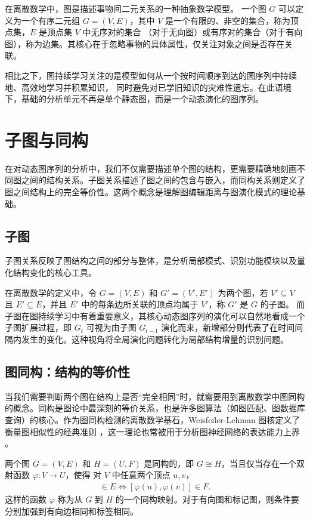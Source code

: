 在离散数学中，图是描述事物间二元关系的一种抽象数学模型。
一个图 $G$ 可以定义为一个有序二元组 $G=(V,E)$，其中 $V$ 是一个有限的、非空的集合，称为顶点集，$E$ 是顶点集 $V$ 中无序对的集合
（对于无向图）或有序对的集合（对于有向图），称为边集。其核心在于忽略事物的具体属性，仅关注对象之间是否存在关联。

相比之下，图持续学习关注的是模型如何从一个按时间顺序到达的图序列中持续地、高效地学习并积累知识，
同时避免对已学旧知识的灾难性遗忘。在此语境下，基础的分析单元不再是单个静态图，而是一个动态演化的图序列。

\section{子图与同构}

在对动态图序列的分析中，我们不仅需要描述单个图的结构，更需要精确地刻画不同图之间的结构关系。子图关系描述了图之间的包含与嵌入，而同构关系则定义了图之间结构上的完全等价性。这两个概念是理解图编辑距离与图演化模式的理论基础。

\subsection{子图}

子图关系反映了图结构之间的部分与整体，是分析局部模式、识别功能模块以及量化结构变化的核心工具。

在离散数学的定义中，令 $G=(V,E)$ 和 $G'=(V',E')$ 为两个图，若 $V'\subseteq V$ 且 $E'\subseteq E$，并且 $E'$ 中的每条边所关联的顶点均属于 $V'$，称 $G'$ 是 $G$ 的子图。
而子图在图持续学习中有着重要意义，其核心动态图序列的演化可以自然地看成一个子图扩展过程，即 $G_t$ 可视为由子图 $G_{t-1}$ 演化而来，新增部分则代表了在时间间隔内发生的变化。这种视角将全局演化问题转化为局部结构增量的识别问题。

\subsection{图同构：结构的等价性}
当我们需要判断两个图在结构上是否“完全相同”时，就需要用到离散数学中图同构的概念。同构是图论中最深刻的等价关系，也是许多图算法（如图匹配、图数据库查询）的核心。作为图同构检测的离散数学基石，Weisfeiler-Lehman 图核定义了衡量图相似性的经典准则 \cite{shervashidze2011weisfeiler}，这一理论也常被用于分析图神经网络的表达能力上界 \cite{xu2019powerful}。

两个图 $G=(V,E)$ 和 $H=(U,F)$ 是同构的，即 $G\cong H$，当且仅当存在一个双射函数 $\varphi:V \rightarrow U$，使得
对 $V$ 中任意两个顶点 $u,v$，
\begin{align}
[u,v]\in E \iff [\varphi(u),\varphi(v)]\in F.
\end{align}
这样的函数 $\varphi$ 称为从 $G$ 到 $H$ 的一个同构映射。对于有向图和标记图，则条件要分别加强到有向边相同和标签相同。

